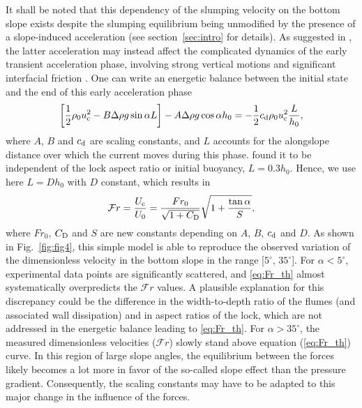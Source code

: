 \documentclass[12pt]{article}
\begin{document}
It shall be noted that this dependency of the slumping velocity on the bottom slope exists despite the slumping equilibrium being unmodified by the presence of a slope-induced acceleration (see section~\ref{sec:intro} for details). As suggested in \citet{Gadal2023}, the latter acceleration may instead affect the complicated dynamics of the early transient acceleration phase, involving strong vertical motions and significant interfacial friction \citep{Cantero2007}.
%
One can write an energetic balance between the initial state and the end of this early acceleration phase \citep{Gadal2023}
\begin{equation}
	\label{eq:energetic_balance}
	\left[\frac{1}{2}\rho_{0}u_{\text c}^{2} - B \Delta\rho g \sin\alpha L\right] - A \Delta\rho g \cos\alpha h_{0} =  - \frac{1}{2}c_{\text d}\rho_{0}u_{\text c}^{2} \frac{L}{h_{0}},
\end{equation}
where $A$, $B$ and $c_{\text d}$ are scaling constants, and $L$ accounts for the alongslope distance over which the current moves during this phase. \citet{Cantero2007} found it to be independent of the lock aspect ratio or initial buoyancy, $L = 0.3 h_{0}$. Hence, we use here $L = D h_{0}$ with $D$ constant, which results in
\begin{equation}
	\label{eq:Fr_th}
	\mathcal{F}r = \frac{U_{\text c}}{U_0} = \frac{Fr_0}{\sqrt{1 + C_{\text D}}} \sqrt{1 + \frac{\tan\alpha}{S}},
\end{equation}
where $Fr_0$, $C_{\text D}$ and $S$ are new constants depending on $A$, $B$, $c_{\text d}$ and $D$. As shown in Fig.~\ref{fig:fig4}, this simple model is able to reproduce the observed variation of the dimensionless velocity in the bottom slope in the range [$5^\circ$, $35^\circ$].
%
For $\alpha < 5^\circ$, experimental data points are significantly scattered, and \eqref{eq:Fr_th} almost systematically overpredicts the $\mathcal{F}r$ values. A plausible explanation for this discrepancy could be the difference in the width-to-depth ratio of the flumes (and associated wall dissipation) and in aspect ratios of the lock, which are not addressed in the energetic balance leading to \eqref{eq:Fr_th}.
%
For $\alpha > 35^\circ$, the measured dimensionless velocities ($\mathcal{F}r$) slowly stand above equation (\ref{eq:Fr_th}) curve. In this region of large slope angles, the equilibrium between the forces likely becomes a lot more in favor of the so-called slope effect than the pressure gradient. Consequently, the scaling constants may have to be adapted to this major change in the influence of the forces.
\end{document}
